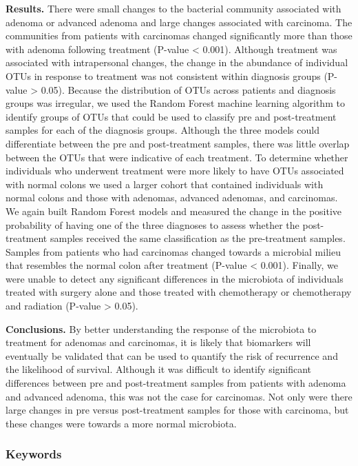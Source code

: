 \documentclass[12pt,]{article}
\begin{document}
\textbf{Results.} There were small changes to the bacterial community
associated with adenoma or advanced adenoma and large changes associated
with carcinoma. The communities from patients with carcinomas changed
significantly more than those with adenoma following treatment (P-value
\textless{} 0.001). Although treatment was associated with intrapersonal
changes, the change in the abundance of individual OTUs in response to
treatment was not consistent within diagnosis groups (P-value
\textgreater{} 0.05). Because the distribution of OTUs across patients
and diagnosis groups was irregular, we used the Random Forest machine
learning algorithm to identify groups of OTUs that could be used to
classify pre and post-treatment samples for each of the diagnosis
groups. Although the three models could differentiate between the pre
and post-treatment samples, there was little overlap between the OTUs
that were indicative of each treatment. To determine whether individuals
who underwent treatment were more likely to have OTUs associated with
normal colons we used a larger cohort that contained individuals with
normal colons and those with adenomas, advanced adenomas, and
carcinomas. We again built Random Forest models and measured the change
in the positive probability of having one of the three diagnoses to
assess whether the post-treatment samples received the same
classification as the pre-treatment samples. Samples from patients who
had carcinomas changed towards a microbial milieu that resembles the
normal colon after treatment (P-value \textless{} 0.001). Finally, we
were unable to detect any significant differences in the microbiota of
individuals treated with surgery alone and those treated with
chemotherapy or chemotherapy and radiation (P-value \textgreater{}
0.05).

\textbf{Conclusions.} By better understanding the response of the
microbiota to treatment for adenomas and carcinomas, it is likely that
biomarkers will eventually be validated that can be used to quantify the
risk of recurrence and the likelihood of survival. Although it was
difficult to identify significant differences between pre and
post-treatment samples from patients with adenoma and advanced adenoma,
this was not the case for carcinomas. Not only were there large changes
in pre versus post-treatment samples for those with carcinoma, but these
changes were towards a more normal microbiota.

\subsubsection{Keywords}\label{keywords}
\end{document}
